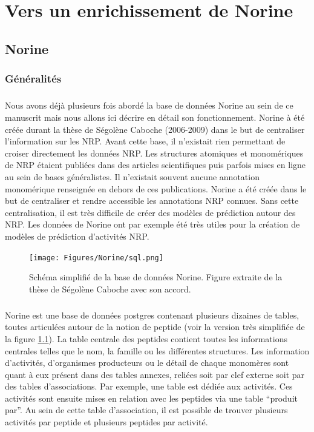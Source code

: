 \documentclass[12pt,french,twoside]{report}
\begin{document}
\chapter{Vers un enrichissement de Norine}

\section{Norine}

\subsection{Généralités}

\paragraph{}Nous avons déjà plusieurs fois abordé la base de données Norine au sein de ce manuscrit mais nous allons ici décrire en détail son fonctionnement.
Norine à été créée durant la thèse de Ségolène Caboche (2006-2009) dans le but de centraliser l'information sur les NRP.
Avant cette base, il n'existait rien permettant de croiser directement les données NRP.
Les structures atomiques et monomériques de NRP étaient publiées dans des articles scientifiques puis parfois mises en ligne au sein de bases généralistes.
Il n'existait souvent aucune annotation monomérique renseignée en dehors de ces publications.
Norine a été créée dans le but de centraliser et rendre accessible les annotations NRP connues.
Sans cette centralisation, il est très difficile de créer des modèles de prédiction autour des NRP.
Les données de Norine ont par exemple été très utiles pour la création de modèles de prédiction d'activités NRP.

\begin{figure}[h!]
  \begin{center}
    \texttt{[image: Figures/Norine/sql.png]}
    \caption{\label{sql}Schéma simplifié de la base de données Norine.
    Figure extraite de la thèse de Ségolène Caboche avec son accord.}
  \end{center}
\end{figure}

\paragraph{}Norine est une base de données postgres contenant plusieurs dizaines de tables, toutes articulées autour de la notion de peptide (voir la version très simplifiée de la figure \ref{sql}).
La table centrale des peptides contient toutes les informations centrales telles que le nom, la famille ou les différentes structures.
Les information d'activités, d'organismes producteurs ou le détail de chaque monomères sont quant à eux présent dans des tables annexes, reliées soit par clef externe soit par des tables d'associations.
Par exemple, une table est dédiée aux activités.
Ces activités sont ensuite mises en relation avec les peptides via une table ``produit par''.
Au sein de cette table d'association, il est possible de trouver plusieurs activités par peptide et plusieurs peptides par activité.
\end{document}
